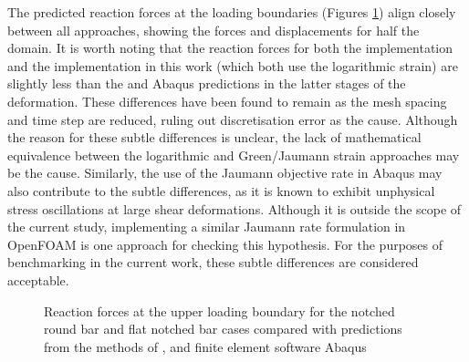\documentclass[sn-mathphys,Numbered]{sn-jnl}%
\begin{document}
The predicted reaction forces at the loading boundaries (Figures \ref{fig:plastic_forces}) align closely between all approaches, showing the forces and displacements for half the domain.
It is worth noting that the reaction forces for both the \citet{clancy_improving_2019} implementation and the implementation in this work (which both use the logarithmic strain) are slightly less than the \citet{cardiff_lagrangian_2017}  and Abaqus predictions in the latter stages of the deformation.
These differences have been found to remain as the mesh spacing and time step are reduced, ruling out discretisation error as the cause.
Although the reason for these subtle differences is unclear, the lack of mathematical equivalence between the logarithmic and Green/Jaumann strain approaches may be the cause.
Similarly, the use of the Jaumann objective rate in Abaqus \cite{soyarslan_finite_2010} may also contribute to the subtle differences, as it is known to exhibit unphysical stress oscillations at large shear deformations.
Although it is outside the scope of the current study, implementing a similar Jaumann rate formulation in OpenFOAM is one approach for checking this hypothesis.
For the purposes of benchmarking in the current work, these subtle differences are considered acceptable.
\begin{figure}[htbp]
	\centering
		\caption{Reaction forces at the upper loading boundary for the notched round bar and flat notched bar cases compared with predictions from the methods of \citet{cardiff_lagrangian_2017}, \citet{clancy_improving_2019} and finite element software Abaqus}
	\label{fig:plastic_forces}
\end{figure}
\FloatBarrier
\end{document}
